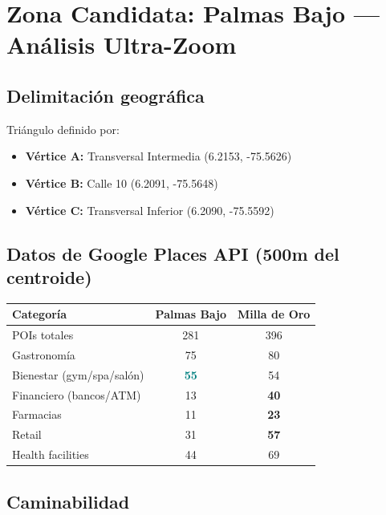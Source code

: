 \documentclass[11pt, a4paper]{article}
\newcommand{\highlight}[1]{\textcolor{teal}{\textbf{#1}}}
\newcommand{\fuente}[1]{\par\vspace{2pt}{\scriptsize\textcolor{slate}{Fuente: #1}}}
\begin{document}
\fuente{MinSalud SISPRO, Supersalud, SURA, Black Book Research 2026, Grand View Research}

\section{Zona Candidata: Palmas Bajo — An\'{a}lisis Ultra-Zoom}

\subsection{Delimitaci\'{o}n geogr\'{a}fica}

Tri\'{a}ngulo definido por:
\begin{itemize}
  \item \textbf{V\'{e}rtice A:} Transversal Intermedia (6.2153, -75.5626)
  \item \textbf{V\'{e}rtice B:} Calle 10 (6.2091, -75.5648)
  \item \textbf{V\'{e}rtice C:} Transversal Inferior (6.2090, -75.5592)
\end{itemize}

\subsection{Datos de Google Places API (500m del centroide)}

\begin{center}
\begin{tabular}{@{}lcc@{}}
\toprule
\textbf{Categor\'{i}a} & \textbf{Palmas Bajo} & \textbf{Milla de Oro} \\
\midrule
POIs totales & 281 & 396 \\
Gastronom\'{i}a & 75 & 80 \\
Bienestar (gym/spa/sal\'{o}n) & \highlight{55} & 54 \\
Financiero (bancos/ATM) & 13 & \textbf{40} \\
Farmacias & 11 & \textbf{23} \\
Retail & 31 & \textbf{57} \\
Health facilities & 44 & 69 \\
\bottomrule
\end{tabular}
\end{center}

\subsection{Caminabilidad}
\end{document}
